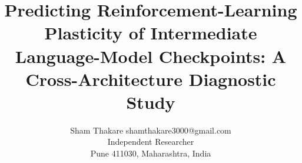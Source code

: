 \documentclass[11pt]{article}
\begin{document}
\title{Predicting Reinforcement-Learning Plasticity of Intermediate Language-Model Checkpoints: A Cross-Architecture Diagnostic Study}

\author{\name Sham Thakare \email shamthakare3000@gmail.com \\
        \addr Independent Researcher\\
        Pune 411030, Maharashtra, India}


\maketitle


















\end{document}
